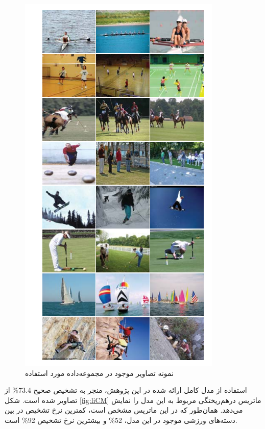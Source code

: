 \begin{enumerate}
	\begin{figure}[h]
		\center
		\includegraphics[scale=0.6]{./Imgs/li2007and_dataset.png}
		\caption{نمونه تصاویر موجود در مجموعه‌داده مورد استفاده \cite{li2007and}}
		\label{fig:lid}
	\end{figure}
	
	استفاده از مدل کامل ارائه شده در این پژوهش، منجر به تشخیص صحیح 73.4\% از تصاویر شده است. شکل
	\ref{fig:liCM}
	ماتریس درهم‌ریختگی
	مربوط به این مدل را نمایش می‌دهد. همان‌طور که در این ماتریس مشخص است، کمترین نرخ تشخیص در بین دسته‌های ورزشی موجود در این مدل، 52\% و بیشترین نرخ تشخیص 92\% است.
	

\end{enumerate}
